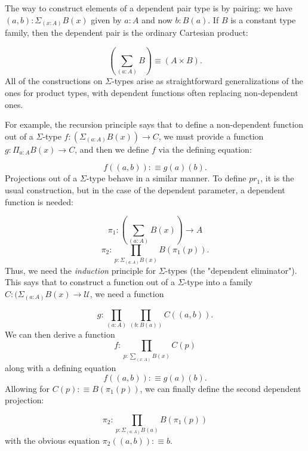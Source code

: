 \documentclass[letterpaper, 10 pt, conference]{ieeeconf}  %
\begin{document}
The way to construct elements of a dependent pair type is by pairing: we have $(a,b) : \Sigma_{(x:A)} B(x)$ given by $a : A$ and now $b : B(a)$. If $B$ is a constant type family, then the dependent pair is the ordinary Cartesian product:

\begin{equation}
    (\sum_{(a : A)} B) \equiv (A \times B).
\end{equation}
All of the constructions on $\Sigma$-types arise as straightforward generalizations of the ones for product types, with dependent functions often replacing non-dependent ones.

For example, the recursion principle says that to define a non-dependent function out of a $\Sigma$-type $f: (\Sigma_{(a:A)} B(x)) \rightarrow C$, we must provide a function $g: \Pi_{a: A} B(x) \rightarrow C$, and then we define $f$ via the defining equation:

\begin{equation}
    f((a,b)) :\equiv g(a)(b).
\end{equation}
Projections out of a $\Sigma$-type behave in a similar manner. To define $pr_1$, it is the usual construction, but in the case of the dependent parameter, a dependent function is needed:

\begin{equation}
    \pi_1: (\sum_{(a:A)} B(x)) \rightarrow A
\end{equation}
\begin{equation}
    \pi_2: \prod_{p: \Sigma_{(a:A)} B(x)} B(\pi_1 (p)).
\end{equation}
Thus, we need the \textit{induction} principle for $\Sigma$-types (the "dependent eliminator"). This says that to construct a function out of a $\Sigma$-type into a family $C: (\Sigma_{(a:A)} B(x) \rightarrow \mathcal{U}$, we need a function

\begin{equation}
    g: \prod_{(a:A)} \prod_{(b:B(a))} C((a,b)).
\end{equation}
We can then derive a function 
\begin{equation}
    f: \prod_{p: \sum_{(x:A)} B(x)} C(p)
\end{equation}
along with a defining equation 
\begin{equation}
    f((a,b)) :\equiv g(a)(b).
\end{equation}
Allowing for $C(p) :\equiv B(\pi_1(p))$, we can finally define the second dependent projection:

\begin{equation}
    \pi_2: \prod_{p:\Sigma_{(a:A)} B(a)} B(\pi_1 (p))
\end{equation}
with the obvious equation $\pi_2((a,b)) :\equiv b$.
\end{document}

